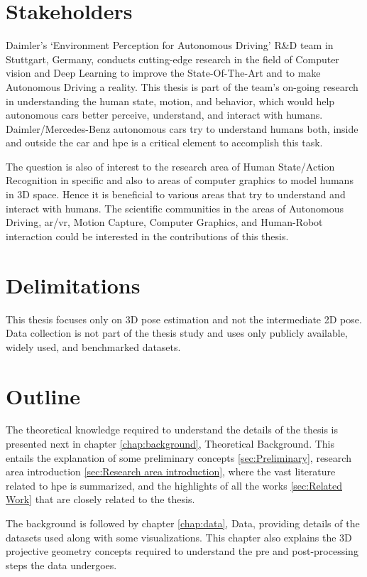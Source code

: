 \section{Stakeholders}
\label{sec:stakeholders}
Daimler’s ‘Environment Perception for Autonomous Driving’ R\&D team in Stuttgart, Germany, conducts cutting-edge research in the field of Computer vision and Deep Learning to improve the State-Of-The-Art and to make Autonomous Driving a reality. This thesis is part of the team’s on-going research in understanding the human state, motion, and behavior, which would help autonomous cars better perceive, understand, and interact with humans. Daimler/Mercedes-Benz autonomous cars try to understand humans both, inside and outside the car and \ac{hpe} is a critical element to accomplish this task.

The question is also of interest to the research area of Human State/Action Recognition in specific and also to areas of computer graphics to model humans in 3D space. Hence it is beneficial to various areas that try to understand and interact with humans. The scientific communities in the areas of Autonomous Driving, \ac{ar/vr}, Motion Capture, Computer Graphics, and Human-Robot interaction could be interested in the contributions of this thesis.

\section{Delimitations}
\label{sec:delimitations}
This thesis focuses only on 3D pose estimation and not the intermediate 2D pose. Data collection is not part of the thesis study and uses only publicly available, widely used, and benchmarked datasets.

\section{Outline}
\label{sec:outline}
The theoretical knowledge required to understand the details of the thesis is presented next in chapter \ref{chap:background}, Theoretical Background. This entails the explanation of some preliminary concepts \ref{sec:Preliminary}, research area introduction \ref{sec:Research area introduction}, where the vast literature related to \ac{hpe} is summarized, and the highlights of all the works \ref{sec:Related Work} that are closely related to the thesis.

The background is followed by chapter \ref{chap:data}, Data,  providing details of the datasets used along with some visualizations. This chapter also explains the 3D projective geometry concepts required to understand the pre and post-processing steps the data undergoes.


